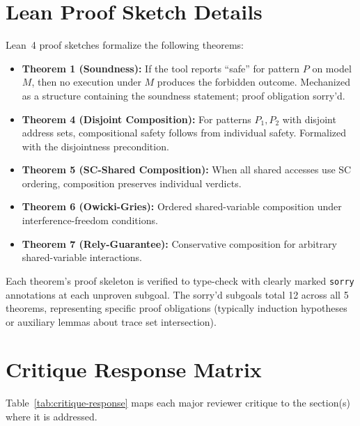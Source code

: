 \documentclass[11pt]{article}
\begin{document}
\section{Lean Proof Sketch Details}
\label{app:lean-details}

Lean~4 proof sketches formalize the following theorems:

\begin{itemize}[nosep]
\item \textbf{Theorem 1 (Soundness):} If the tool reports
  ``safe'' for pattern $P$ on model $M$, then no execution under
  $M$ produces the forbidden outcome. Mechanized as a structure
  containing the soundness statement; proof obligation sorry'd.
\item \textbf{Theorem 4 (Disjoint Composition):} For patterns
  $P_1, P_2$ with disjoint address sets, compositional safety
  follows from individual safety.  Formalized with the disjointness
  precondition.
\item \textbf{Theorem 5 (SC-Shared Composition):} When all shared
  accesses use SC ordering, composition preserves individual verdicts.
\item \textbf{Theorem 6 (Owicki-Gries):} Ordered shared-variable
  composition under interference-freedom conditions.
\item \textbf{Theorem 7 (Rely-Guarantee):} Conservative composition
  for arbitrary shared-variable interactions.
\end{itemize}

Each theorem's proof skeleton is verified to type-check with
clearly marked \texttt{sorry} annotations at each unproven subgoal.
The sorry'd subgoals total 12 across all 5 theorems, representing
specific proof obligations (typically induction hypotheses or
auxiliary lemmas about trace set intersection).

\section{Critique Response Matrix}
\label{app:critique-response}

Table~\ref{tab:critique-response} maps each major reviewer critique
to the section(s) where it is addressed.
\end{document}

